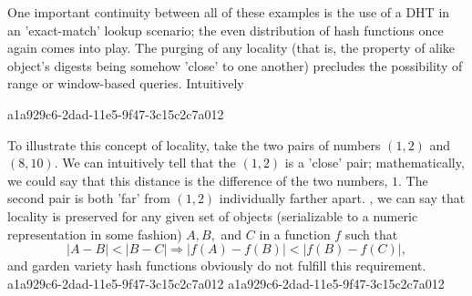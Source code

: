 \documentclass[12pt]{article}
\begin{document}
\par One important continuity between all of these examples is the use of a DHT in an 'exact-match' lookup scenario; the even distribution of hash functions once again comes into play. The purging of any locality (that is, the property of alike object's digests being somehow 'close' to one another) precludes the possibility of range or window-based queries. Intuitively

a1a929c6-2dad-11e5-9f47-3c15c2c7a012\par To illustrate this concept of locality, take the two pairs of numbers $(1,2)$ and $(8,10)$. We can intuitively tell that the $(1,2)$ is a 'close' pair; mathematically, we could say that this distance is the difference of the two numbers, $1$. The second pair is both 'far' from $(1,2)$ individually farther apart. , we can say that locality is preserved for any given set of objects (serializable to a numeric representation in some fashion) $A,B,$ and $C$ in a function $f$ such that
\begin{equation}
|A-B| < |B-C| \Rightarrow |f(A)-f(B)| < |f(B) - f(C)|,
\end{equation}
and garden variety hash functions obviously do not fulfill this requirement.
a1a929c6-2dad-11e5-9f47-3c15c2c7a012
\printbibliography
a1a929c6-2dad-11e5-9f47-3c15c2c7a012
\end{document}
